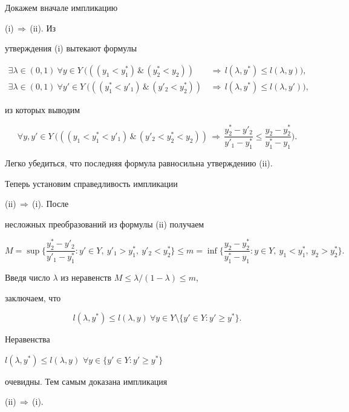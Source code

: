 \begin{pf} Докажем вначале импликацию 


(i)$\,\Longrightarrow\,$(ii). Из 


утверждения (i) вытекают формулы 


\begin{align*}


\exists\lambda\in(0,1)\ \forall y\in Y\ (((y_1<y^*_1)\,{\&}\, 


(y^*_2<y_2))\,&\Longrightarrow\,l(\lambda,y^*)\le l(\lambda,y)),\\ 


% 


\exists\lambda\in(0,1)\ \forall y'\in Y\ (((y^*_1<y'_1)\,{\&}\, 


(y'_2<y^*_2))\,&\Longrightarrow\,l(\lambda,y^*)\le l(\lambda,y')),


\end{align*} 


из которых выводим 


$$ 


\forall y,y'\in Y\ \bigg(((y_1<y^*_1<y'_1)\,\&\,


(y'_2<y^*_2<y_2))\,\Longrightarrow\, 


\frac{y^*_2-y'_2}{y'_1-y^*_1}\le 


\frac{y_2-y^*_2}{y^*_1-y_1}\bigg).


$$ 


Легко убедиться, что последняя формула равносильна утверждению (ii). 


 


Теперь установим справедливость импликации 


(ii)$\,\Longrightarrow\,$(i). После 


несложных преобразований из формулы (ii) получаем 


$$ 


M=\sup\bigg\{\frac{y^*_2-y'_2}{y'_1-y^*_1}:y'\in Y,\ y'_1> 


y^*_1,\ y'_2<y^*_2\bigg\}\le 


m=\inf\bigg\{\frac{y_2-y^*_2}{y^*_1-y_1}:y\in Y,\ y_1< 


y^*_1,\ y_2>y^*_2\bigg\}.


$$ 


Введя число $\lambda$ из неравенств $M\le\lambda/(1-\lambda)\le m$, 


заключаем, что 


$$ 


l(\lambda,y^*)\le l(\lambda,y)\ \forall y\in Y\setminus 


\{y'\in Y:y'\ge y^*\}. 


$$ 


Неравенства 


$l(\lambda,y^*)\le l(\lambda,y)$\; $\forall y\in 


\{y'\in Y:y'\ge y^*\}$ 


очевидны. Тем самым доказана импликация 


(ii)$\,\Longrightarrow\,$(i).


\end{pf} 


